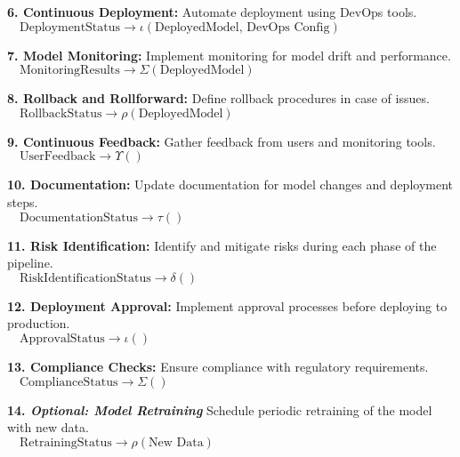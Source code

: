 \documentclass[12pt, letterpaper]{article}
\begin{document}
\begin{algorithm}[h!]
\begin{algorithmic}[1]
        \State \textbf{6. Continuous Deployment:}
        \State \quad Automate deployment using DevOps tools. \\
        $ \quad \text{DeploymentStatus} \xrightarrow{} \iota(\text{DeployedModel, DevOps Config})$ 

        \State \textbf{7. Model Monitoring:}
        \State \quad Implement monitoring for model drift and performance. \\
        $ \quad \text{MonitoringResults} \xrightarrow{} \Sigma(\text{DeployedModel})$ 

        \State \textbf{8. Rollback and Rollforward:}
        \State \quad Define rollback procedures in case of issues. \\
        $ \quad \text{RollbackStatus} \xrightarrow{} \rho(\text{DeployedModel})$ 

        \State \textbf{9. Continuous Feedback:}
        \State \quad Gather feedback from users and monitoring tools. \\
        $ \quad \text{UserFeedback} \xrightarrow{} \Upsilon()$ 

        \State \textbf{10. Documentation:}
        \State \quad Update documentation for model changes and deployment steps. \\
        $ \quad \text{DocumentationStatus} \xrightarrow{} \tau()$ 

        \State \textbf{11. Risk Identification:}
        \State \quad Identify and mitigate risks during each phase of the pipeline. \\
        $ \quad \text{RiskIdentificationStatus} \xrightarrow{} \delta()$ 

        \State \textbf{12. Deployment Approval:}
        \State \quad Implement approval processes before deploying to production. \\
        $ \quad \text{ApprovalStatus} \xrightarrow{} \iota()$ 

        \State \textbf{13. Compliance Checks:}
        \State \quad Ensure compliance with regulatory requirements. \\
        $ \quad \text{ComplianceStatus} \xrightarrow{} \Sigma()$ 

        \State \textbf{14. \textit{Optional: Model Retraining}}
        \State \quad Schedule periodic retraining of the model with new data. \\
        $ \quad \text{RetrainingStatus} \xrightarrow{} \rho(\text{New Data})$ 


\end{algorithmic}
\end{algorithm}
\end{document}
